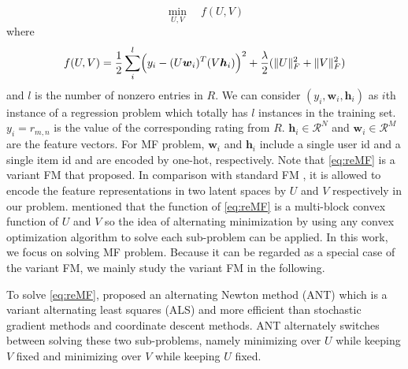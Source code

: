 \documentclass[11pt,twoside]{article}
\newcommand{\bsym}[1]{\ensuremath{\boldsymbol{#1}}}
\newcommand{\bw}{\ensuremath{\bsym{w}}}
\newcommand{\bh}{\ensuremath{\bsym{h}}}
\newcommand{\bbr}{\ensuremath{\mathcal R}}
\begin{document}
\begin{equation}
\min_{U, V} \quad f(U, V)\label{eq:reMF}
\end{equation}
where 
\begin{equation}
    f(U, V) = \frac{1}{2}\sum_{i}^l  \Bigl(y_i - (U \bw_i)^T (V \bh_i)\Bigr)^2+
    \frac{\lambda}{2} (\|U\|^2_F +\|V\|^2_F	)
    \label{eq:min_reMF}
\end{equation}
and $l$ is the number of nonzero entries in $R$. We can consider $(y_i, \bw_i, \bh_i)$ as $i$th instance of a regression problem which totally has $l$ instances in the training set.
$y_i=r_{m, n}$ is the value of the corresponding rating from $R$. $\bh_i \in \bbr^N $ and $\bw_i \in \bbr^M$ are the feature vectors. For MF problem, $\bw_i$ and $\bh_i$  include a single user id and a single item id and are encoded by one-hot, respectively.  
Note that \eqref{eq:reMF} is a variant FM that \citet{MB16a} proposed. 
In comparison with standard FM \citep{SR10c}, 
it is allowed to encode the feature representations in two latent spaces by $U$ and $V$ respectively in our problem. 
\citet{MB16a} mentioned that the function of \eqref{eq:reMF} is a multi-block convex function of $U$ and $V$ so the idea of alternating minimization by using any convex optimization algorithm to solve each sub-problem can be applied. In this work, we focus on solving MF problem. Because it can be regarded as a special case of the variant FM, we mainly study the variant FM in the following.


To solve \eqref{eq:reMF}, \citet{WSC18a} proposed an alternating Newton method (ANT) which is a variant alternating least squares (ALS) and more efficient than stochastic gradient methods and coordinate descent methods. ANT alternately switches between solving these two sub-problems, namely minimizing over $U$ while keeping $V$ fixed and minimizing over $V$ while keeping $U$ fixed.
\end{document}
